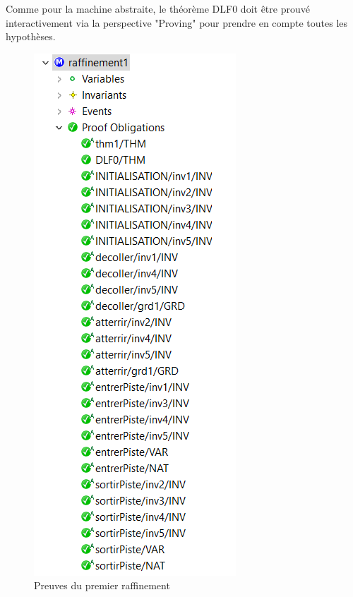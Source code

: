  Comme pour la machine abstraite, le théorème DLF0 doit être prouvé interactivement via la perspective "Proving" pour prendre en compte toutes les hypothèses.
 
 \begin{figure}[H]
 	\begin{center}	
 		\includegraphics[scale=1.2]{images/1/proof1}
 		\caption{Preuves du premier raffinement}
 		\label{proof1}
 	\end{center}
 \end{figure}
 

 
 




